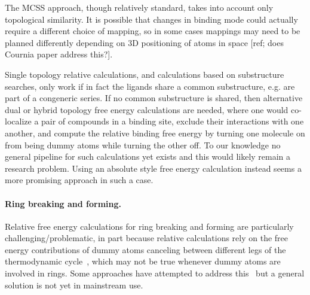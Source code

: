 \documentclass[9pt,bestpractices]{livecoms}
\begin{document}
The MCSS approach, though relatively standard, takes into account only topological similarity.
It is possible that changes in binding mode could actually require a different choice of mapping, so in some cases mappings may need to be planned differently depending on 3D positioning of atoms in space [ref; does Cournia paper address this?].

Single topology relative calculations, and calculations based on substructure searches, only work if in fact the ligands share a common substructure, e.g. are part of a congeneric series.
If no common substructure is shared, then alternative dual or hybrid topology free energy calculations are needed, where one would co-localize a pair of compounds in a binding site, exclude their interactions with one another, and compute the relative binding free energy by turning one molecule on from being dummy atoms while turning the other off.
To our knowledge no general pipeline for such calculations yet exists and this would likely remain a research problem. Using an absolute style free energy calculation instead seems a more promising approach in such a case. 

\paragraph{Ring breaking and forming.} Relative free energy calculations for ring breaking and forming are particularly challenging/problematic, in part because relative calculations rely on the free energy contributions of dummy atoms canceling between different legs of the thermodynamic cycle~\cite{}, which may not be true whenever dummy atoms are involved in rings.
Some approaches have attempted to address this~\cite{clark2019relative} but a general solution is not yet in mainstream use.
\end{document}
